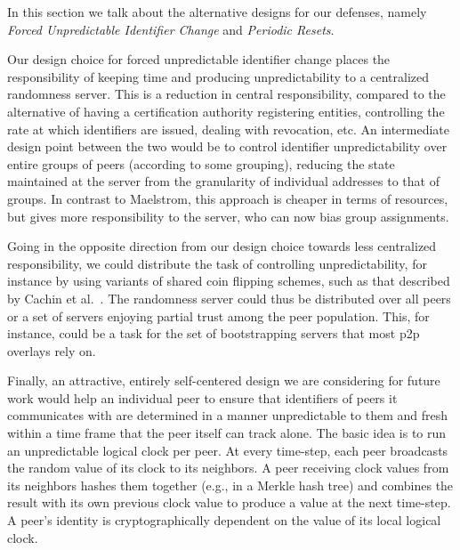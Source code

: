\documentclass[10pt,twocolumn]{article}
\begin{document}
\label{sec:alternatives}
In this section we talk about the alternative designs for our defenses,
namely \emph{Forced Unpredictable Identifier Change} and
\emph{Periodic Resets}.


Our design choice for forced unpredictable identifier change places the
responsibility of keeping time and producing unpredictability to a centralized
randomness server.  This is a reduction in central responsibility, compared to the
alternative of having a certification authority registering entities,
controlling the rate at which identifiers are issued, dealing with revocation,
etc.  An intermediate design point between the two would be to control
identifier unpredictability over entire groups of peers (according to some
grouping), reducing the state maintained at the server from the granularity of
individual addresses to that of groups. In contrast to Maelstrom, this
approach is cheaper in terms of resources, but gives more responsibility
to the server, who can now bias group assignments. 

Going in the opposite direction from our design choice towards less
centralized responsibility, we could distribute the task of controlling
unpredictability, for instance by using variants of shared coin flipping
schemes, such as that described by Cachin et al.~\cite{Cachin2000short}.
The randomness server could thus be distributed over all peers or a set
of servers enjoying partial trust among the peer population.  This, for
instance, could be a task for the set of bootstrapping servers that most
p2p overlays rely on.

Finally, an attractive, entirely self-centered design we are considering
for future work would help an individual peer to ensure that identifiers
of peers it communicates with are determined in a manner unpredictable
to them and fresh within a time frame that the peer itself can track
alone.  The basic idea is to run an unpredictable logical clock per
peer.  At every time-step, each peer broadcasts the random value of its
clock to its neighbors.  A peer receiving clock values from its
neighbors hashes them together (e.g., in a Merkle hash tree) and
combines the result with its own previous clock value to produce a value
at the next time-step.  A peer's identity is cryptographically dependent
on the value of its local logical clock.
\end{document}
